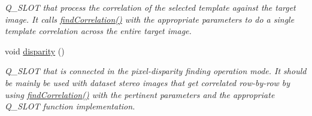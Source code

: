 \begin{CompactItemize}
\begin{CompactList}\small\item\em Q\_\-SLOT that process the correlation of the selected template against the target image. It calls \hyperlink{classQcorr_05dcc1b0be4596b355df235264180da4}{findCorrelation()} with the appropriate parameters to do a single template correlation across the entire target image. \item\end{CompactList}\item 
\hypertarget{classQcorr_640ee4c76350e5886deddbf4f0d50594}{
void \hyperlink{classQcorr_640ee4c76350e5886deddbf4f0d50594}{disparity} ()}
\label{classQcorr_640ee4c76350e5886deddbf4f0d50594}

\begin{CompactList}\small\item\em Q\_\-SLOT that is connected in the pixel-disparity finding operation mode. It should be mainly be used with dataset stereo images that get correlated row-by-row by using \hyperlink{classQcorr_05dcc1b0be4596b355df235264180da4}{findCorrelation()} with the pertinent parameters and the appropriate Q\_\-SLOT function implementation. \item\end{CompactList}\end{CompactItemize}
